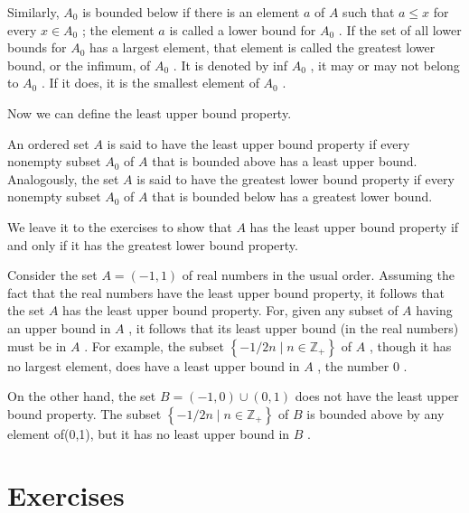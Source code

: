Similarly, \({A}_{0}\) is bounded below if there is an element \(a\) of \(A\) such that \(a \leq  x\) for every \(x \in  {A}_{0}\) ; the element \(a\) is called a lower bound for \({A}_{0}\) . If the set of all lower bounds for \({A}_{0}\) has a largest element, that element is called the greatest lower bound, or the infimum, of \({A}_{0}\) . It is denoted by inf \({A}_{0}\) , it may or may not belong to \({A}_{0}\) . If it does, it is the smallest element of \({A}_{0}\) .

Now we can define the least upper bound property.

\begin{definition} An ordered set \(A\) is said to have the least upper bound property if every nonempty subset \({A}_{0}\) of \(A\) that is bounded above has a least upper bound. Analogously, the set \(A\) is said to have the greatest lower bound property if every nonempty subset \({A}_{0}\) of \(A\) that is bounded below has a greatest lower bound.
\end{definition}


We leave it to the exercises to show that \(A\) has the least upper bound property if and only if it has the greatest lower bound property.

\begin{centeredblock}
\begin{example} Consider the set \(A = \left( {-1,1}\right)\) of real numbers in the usual order. Assuming the fact that the real numbers have the least upper bound property, it follows that the set \(A\) has the least upper bound property. For, given any subset of \(A\) having an upper bound in \(A\) , it follows that its least upper bound (in the real numbers) must be in \(A\) . For example, the subset \(\left\{  {-1/{2n} \mid  n \in  {\mathbb{Z}}_{ + }}\right\}\) of \(A\) , though it has no largest element, does have a least upper bound in \(A\) , the number 0 .

On the other hand, the set \(B = \left( {-1,0}\right)  \cup  \left( {0,1}\right)\) does not have the least upper bound property. The subset \(\left\{  {-1/{2n} \mid  n \in  {\mathbb{Z}}_{ + }}\right\}\) of \(B\) is bounded above by any element of(0,1), but it has no least upper bound in \(B\) .
\end{example}
\end{centeredblock}

\section*{Exercises}

